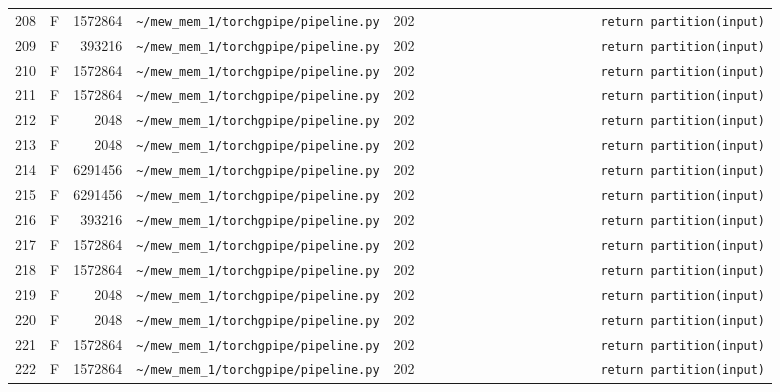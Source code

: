 \documentclass{article}
\begin{document}
\begin{longtable}{r l r p{6.5cm} r p{7.0cm}}
208 & F & 1572864 & \lstinline|~/mew_mem_1/torchgpipe/pipeline.py| & 202 & \lstinline|                        return partition(input)| \\
209 & F & 393216 & \lstinline|~/mew_mem_1/torchgpipe/pipeline.py| & 202 & \lstinline|                        return partition(input)| \\
210 & F & 1572864 & \lstinline|~/mew_mem_1/torchgpipe/pipeline.py| & 202 & \lstinline|                        return partition(input)| \\
211 & F & 1572864 & \lstinline|~/mew_mem_1/torchgpipe/pipeline.py| & 202 & \lstinline|                        return partition(input)| \\
212 & F & 2048 & \lstinline|~/mew_mem_1/torchgpipe/pipeline.py| & 202 & \lstinline|                        return partition(input)| \\
213 & F & 2048 & \lstinline|~/mew_mem_1/torchgpipe/pipeline.py| & 202 & \lstinline|                        return partition(input)| \\
214 & F & 6291456 & \lstinline|~/mew_mem_1/torchgpipe/pipeline.py| & 202 & \lstinline|                        return partition(input)| \\
215 & F & 6291456 & \lstinline|~/mew_mem_1/torchgpipe/pipeline.py| & 202 & \lstinline|                        return partition(input)| \\
216 & F & 393216 & \lstinline|~/mew_mem_1/torchgpipe/pipeline.py| & 202 & \lstinline|                        return partition(input)| \\
217 & F & 1572864 & \lstinline|~/mew_mem_1/torchgpipe/pipeline.py| & 202 & \lstinline|                        return partition(input)| \\
218 & F & 1572864 & \lstinline|~/mew_mem_1/torchgpipe/pipeline.py| & 202 & \lstinline|                        return partition(input)| \\
219 & F & 2048 & \lstinline|~/mew_mem_1/torchgpipe/pipeline.py| & 202 & \lstinline|                        return partition(input)| \\
220 & F & 2048 & \lstinline|~/mew_mem_1/torchgpipe/pipeline.py| & 202 & \lstinline|                        return partition(input)| \\
221 & F & 1572864 & \lstinline|~/mew_mem_1/torchgpipe/pipeline.py| & 202 & \lstinline|                        return partition(input)| \\
222 & F & 1572864 & \lstinline|~/mew_mem_1/torchgpipe/pipeline.py| & 202 & \lstinline|                        return partition(input)| \\

\end{longtable}
\end{document}
